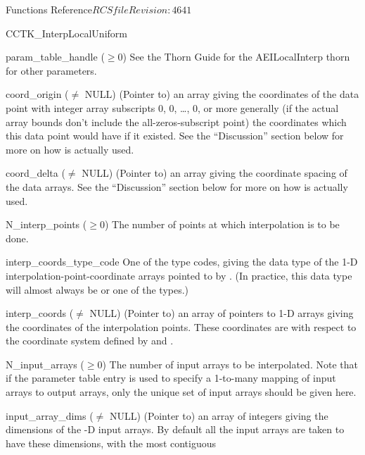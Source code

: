 \begin{cactuspart}{ Functions Reference}{$RCSfile$}{$Revision: 4641 $}
\begin{FunctionDescription}{CCTK\_InterpLocalUniform}
\begin{ParameterSection}
\begin{Parameter}{param\_table\_handle ($\ge 0$)}
See the Thorn Guide for the AEILocalInterp thorn for other parameters.
\end{Parameter}
\begin{Parameter}{coord\_origin ($\ne$ NULL)}
\hbox{}
(Pointer to) an array giving the coordinates of the data point with
integer array subscripts 0, 0, \dots, 0, or more generally (if the actual
array bounds don't include the all-zeros-subscript point) the coordinates
which this data point would have if it existed.  See the ``Discussion''
section below for more on how  is actually used.
\end{Parameter}
\begin{Parameter}{coord\_delta ($\ne$ NULL)}
\hbox{}
(Pointer to) an array giving the coordinate spacing of the data arrays.
See the ``Discussion'' section below for more on how 
is actually used.
\end{Parameter}
\begin{Parameter}{N\_interp\_points ($\ge 0$)}
\hbox{}
The number of points at which interpolation is to be done.
\end{Parameter}
\begin{Parameter}{interp\_coords\_type\_code}
\hbox{}
One of the  type codes, giving the data type
of the 1-D interpolation-point-coordinate arrays pointed to by
.  (In practice, this data type will almost
always be  or one of the  types.)
\end{Parameter}
\begin{Parameter}{interp\_coords ($\ne$ NULL)}
\hbox{}
(Pointer to) an array of  pointers to 1-D arrays giving the
coordinates of the interpolation points.  These coordinates are with
respect to the coordinate system defined by  and
.
\end{Parameter}
\begin{Parameter}{N\_input\_arrays ($\ge 0$)}
\hbox{}
The number of input arrays to be interpolated.
Note that if the parameter table entry 
is used to specify a 1-to-many mapping of input arrays to output arrays,
only the unique set of input arrays should be given here.
\end{Parameter}
\begin{Parameter}{input\_array\_dims ($\ne$ NULL)}
\hbox{}
(Pointer to) an array of  integers giving the dimensions
of the -D input arrays.  By default all the input arrays
are taken to have these dimensions, with \code{[0]} the most contiguous

\end{Parameter}
\end{ParameterSection}
\end{FunctionDescription}
\end{cactuspart}
